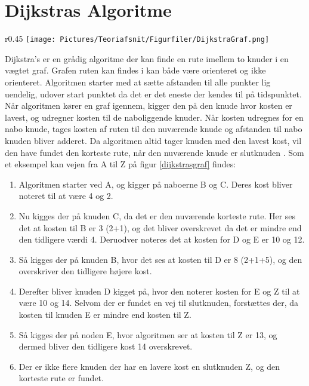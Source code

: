 \section{Dijkstras Algoritme}\label{DijkstraTeori}
\begin{wrapfigure}{r}{0.45\textwidth}
    \centering
  \texttt{[image: Pictures/Teoriafsnit/Figurfiler/DijkstraGraf.png]}
\caption{En vægtet ikke-orienteret graf}\label{dijkstrasgraf}
\end{wrapfigure}

Dijkstra's er en grådig algoritme der kan finde en rute imellem to knuder i en vægtet graf. Grafen ruten kan findes i kan både være orienteret og ikke orienteret. Algoritmen starter med at sætte afstanden til alle punkter lig uendelig, udover start punktet da det er det eneste der kendes til på tidspunktet. Når algoritmen kører en graf igennem, kigger den på den knude hvor kosten er lavest, og udregner kosten til de naboliggende knuder. Når kosten udregnes for en nabo knude, tages kosten af ruten til den nuværende knude og afstanden til nabo knuden bliver adderet. Da algoritmen altid tager knuden med den lavest kost, vil den have fundet den korteste rute, når den nuværende knude er slutknuden \cite[s. 681-684]{DMATBOGEN}. Som et eksempel kan vejen fra A til Z på figur \ref{dijkstrasgraf} findes:

\begin{enumerate}
\item Algoritmen starter ved A, og kigger på naboerne B og C. Deres kost bliver noteret til at være 4 og 2.
\item Nu kigges der på knuden C, da det er den nuværende korteste rute. Her ses det at kosten til B er 3 (2+1), og det bliver overskrevet da det er mindre end den tidligere værdi 4. Deruodver noteres det at kosten for D og E er 10 og 12.
\item Så kigges der på knuden B, hvor det ses at kosten til D er 8 (2+1+5), og den overskriver den tidligere højere kost.
\item Derefter bliver knuden D kigget på, hvor den noterer kosten for E og Z til at være 10 og 14. Selvom der er fundet en vej til slutknuden, forstættes der, da kosten til knuden E er mindre end kosten til Z.
\item Så kigges der på noden E, hvor algoritmen ser at kosten til Z er 13, og dermed bliver den tidligere kost 14 overskrevet.
\item Der er ikke flere knuden der har en lavere kost en slutknuden Z, og den korteste rute er fundet.
\end{enumerate}

